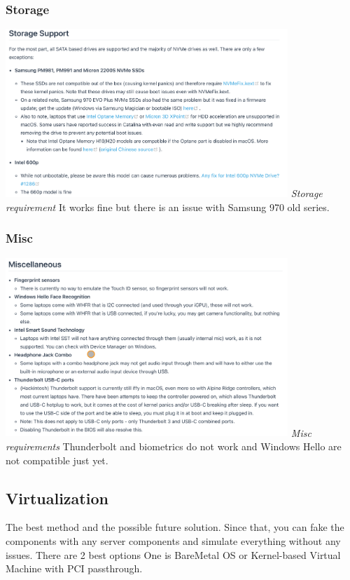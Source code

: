 \documentclass[12pt, letterpaper]{article}
\begin{document}
\subsubsection{Storage}
\includegraphics[width=0.8\textwidth]{fotos/PSP/Research/Native/Open core req storage.jpeg}
\break
\emph{Storage requirement}
\hfill\break
\hfill\break
It works fine but there is an issue with Samsung 970 old series.
\hfill\break
\hfill\break
\newpage
\subsubsection{Misc}
\includegraphics[width=0.8\textwidth]{fotos/PSP/Research/Native/Opendoe req misc.jpeg}
\break
\emph{Misc requirements}
\hfill\break
\hfill\break
Thunderbolt and biometrics do not work and Windows Hello are not compatible just yet.
\newpage
\subsection{Virtualization}
The best method and the possible future solution. Since that, you can fake the components with any server components and simulate everything without any issues. There are 2 best options One is BareMetal OS or Kernel-based Virtual Machine with PCI passthrough.
\end{document}

